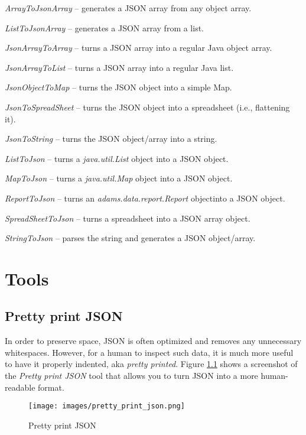 \documentclass[a4paper]{book}
\begin{document}
\begin{tight_itemize}
	\item \textit{ArrayToJsonArray} -- generates a JSON array from any object	array.
	\item \textit{ListToJsonArray} -- generates a JSON array from a list.
	\item \textit{JsonArrayToArray} -- turns a JSON array into a regular Java	object array.
	\item \textit{JsonArrayToList} -- turns a JSON array into a regular Java list.
	\item \textit{JsonObjectToMap} -- turns the JSON object into a simple Map.
	\item \textit{JsonToSpreadSheet} -- turns the JSON object into a spreadsheet (i.e., flattening it).
	\item \textit{JsonToString} -- turns the JSON object/array into a string.
	\item \textit{ListToJson} -- turns a \textit{java.util.List} object	into a JSON object.
	\item \textit{MapToJson} -- turns a \textit{java.util.Map} object	into a JSON object.
	\item \textit{ReportToJson} -- turns an \textit{adams.data.report.Report} objectinto a JSON object.
	\item \textit{SpreadSheetToJson} -- turns a spreadsheet into a JSON array object.
	\item \textit{StringToJson} -- parses the string and generates a JSON	object/array.
\end{tight_itemize}

\chapter{Tools}

\section{Pretty print JSON}
In order to preserve space, JSON is often optimized and removes any unnecessary
whitespaces. However, for a human to inspect such data, it is much more useful
to have it properly indented, aka \textit{pretty printed}. Figure \ref{pretty_print_json}
shows a screenshot of the \textit{Pretty print JSON} tool that allows you to
turn JSON into a more human-readable format.
\begin{figure}[htb]
  \centering
  \texttt{[image: images/pretty\_print\_json.png]}
  \caption{Pretty print JSON}
  \label{pretty_print_json}
\end{figure}
\end{document}
